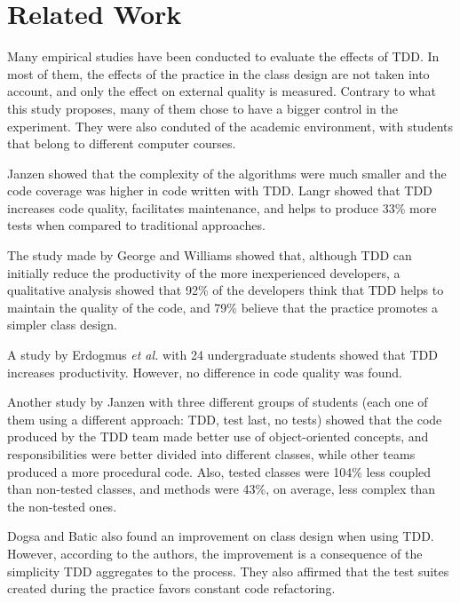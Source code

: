 \documentclass[times]{elsarticle}
\begin{document}
\section{Related Work}
\label{cap:trabalhos-relacionados}

Many empirical studies have been conducted to evaluate the effects of TDD.
In most of them, the effects of the practice in the class design are not taken
into account, and only the effect on external quality is measured.
Contrary to what this study proposes, many of them chose
to have a bigger control in the experiment. They were also conduted of the academic
environment, with students that belong to different computer courses.

Janzen \cite{janzen-arch-improvement} showed that the complexity of the algorithms
were much smaller and the code coverage was higher in code written with TDD.
Langr \cite{langr} showed that TDD increases code quality, facilitates
maintenance, and helps to produce 33\% more tests when compared to traditional
approaches.

The study made by George and Williams \cite{george-e-williams} showed that,
although TDD can initially reduce the productivity of the more inexperienced
developers, a qualitative analysis showed that 92\% of the developers think
that TDD helps to maintain the quality of the code, and 79\% believe that
the practice promotes a simpler class design.

A study by Erdogmus \textit{et al.} \cite{erdogmus-morisio} with 24 undergraduate students
showed that TDD increases productivity. However, no difference in code quality
was found.

Another study by Janzen \cite{janzen-saiedian} with three different groups
of students (each one of them using a different approach: TDD, test last, no tests)
showed that the code produced by the TDD team made better use of object-oriented
concepts, and responsibilities were better divided into different classes,
while other teams produced a more procedural code. Also, tested classes were
104\% less coupled than non-tested classes, and methods were 43\%, on average, less complex
than the non-tested ones.

Dogsa and Batic \cite{dogsa-batic} also found an improvement on class design when
using TDD. However, according to the authors, the improvement is a consequence of the simplicity
TDD aggregates to the process. They also affirmed that the test suites created during
the practice favors constant code refactoring.
\end{document}
